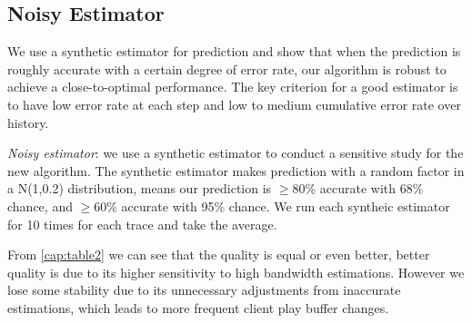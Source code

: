 \subsection{Noisy Estimator}\label{sub:noisy}
We use a synthetic estimator for prediction and show that when the prediction is roughly accurate with a certain degree of error rate, our algorithm is robust to achieve a close-to-optimal performance. The key criterion for a good estimator is to have low error rate at each step and low to medium cumulative error rate over history. 

\emph{Noisy estimator}: we use a synthetic estimator to conduct a sensitive study for the new algorithm. The synthetic estimator makes prediction with a random factor in a N(1,0.2) distribution, means our prediction is $\geq$80\% accurate with 68\% chance, and $\geq 60\%$ accurate with 95\% chance. We run each syntheic estimator for 10 times for each trace and take the average. 

From \autoref{cap:table2} we can see that the quality is equal or even better, better quality is due to its higher sensitivity to high bandwidth estimations. However we lose some stability due to its unnecessary adjustments from inaccurate estimations, which leads to more frequent client play buffer changes. 

